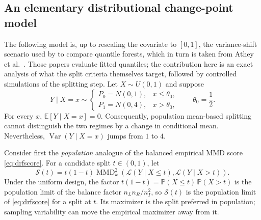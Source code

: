 \documentclass[12pt,a4paper]{article}
\newcommand{\E}{\mathbb E}
\newcommand{\Pp}{\mathbb P}
\newcommand{\MMD}{\operatorname{MMD}}
\newcommand{\Var}{\operatorname{Var}}
\newcommand{\1}{\mathbf 1}
\begin{document}
\subsection{An elementary distributional change-point model}
The following model is, up to rescaling the covariate to $[0,1]$, the variance-shift scenario used by \cite[Section~4.2]{cevid2022} to compare quantile forests, which in turn is taken from Athey et al.\ \cite{athey2019}. Those papers evaluate fitted quantiles; the contribution here is an exact analysis of what the split criteria themselves target, followed by controlled simulations of the splitting step.
Let $X\sim U(0,1)$ and suppose
\begin{equation}\label{eq:model}
 Y\mid X=x\sim
 \begin{cases}
  P_0=N(0,1),&x\le\theta_0,\\
  P_1=N(0,4),&x>\theta_0,
 \end{cases}\qquad \theta_0=\frac12.
\end{equation}
For every $x$, $\E[Y\mid X=x]=0$. Consequently, population mean-based splitting cannot distinguish the two regimes by a change in conditional mean. Nevertheless, $\Var(Y\mid X=x)$ jumps from $1$ to $4$.

Consider first the \emph{population} analogue of the balanced empirical MMD score \eqref{eq:drfscore}. For a candidate split $t\in(0,1)$, let
\begin{equation}\label{eq:popsplit}
 \mathcal S(t)=t(1-t)\MMD_k^2\!\left(\mathcal L(Y\mid X\le t),\mathcal L(Y\mid X>t)\right).
\end{equation}
Under the uniform design, the factor $t(1-t)=\Pp(X\le t)\,\Pp(X>t)$ is the population limit of the balance factor $n_Ln_R/n_I^2$, so $\mathcal S(t)$ is the population limit of \eqref{eq:drfscore} for a split at $t$. Its maximizer is the split preferred in population; sampling variability can move the empirical maximizer away from it.
\end{document}

